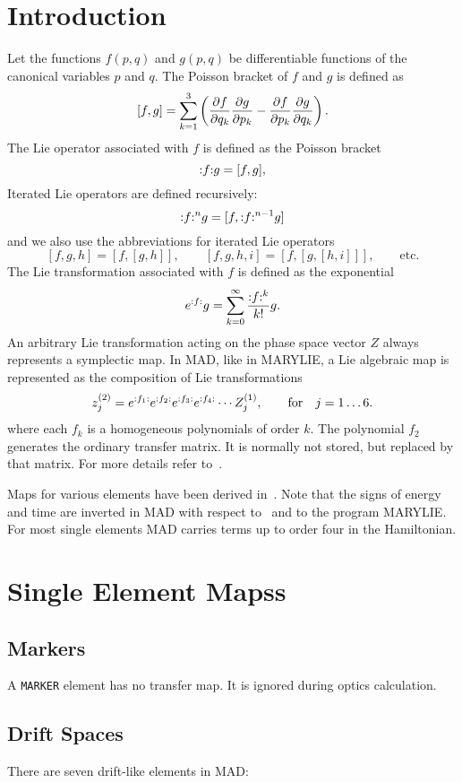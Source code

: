 \section{Introduction}
\label{LieIntro}
Let the functions $f(p,q)$ and $g(p,q)$ be differentiable functions of
the canonical variables $p$ and $q$. The Poisson bracket of $f$ and
$g$ is defined as
\[
[f,g] = \sum_{k=1}^3\left( {\partial f\over\partial q_k}{\partial g\over\partial p_k} - {\partial f\over\partial p_k}{\partial g\over\partial q_k} \right).
\]
The Lie operator associated with $f$ is defined as the Poisson bracket
\[
{:}{f}{:} g = [f,g],
\]
Iterated Lie operators are defined recursively:
\[
{:}{f}{:}^n g = [f,{:}{f}{:}^{n-1}g]
\]
and we also use the abbreviations for iterated Lie operators
\[
[f,g,h] = [f,[g,h]], \qquad
[f,g,h,i] = [f,[g,[h,i]]],\qquad
\mathrm{etc.}
\]
The Lie transformation associated with $f$ is defined as the exponential
\[
e^{{:}{f}{:}} g = \sum_{k=0}^\infty \frac{{:}{f}{:}^k}{k!} g.
\]
An arbitrary Lie transformation acting on the phase space vector $Z$
always represents a symplectic map.
In MAD, like in MARYLIE,
a Lie algebraic map is represented as the composition of Lie
transformations
\[
z^{(2)}_j = e^{{:}{f_1}{:}} e^{{:}{f_2}{:}} e^{{:}{f_3}{:}} e^{{:}{f_4}{:}} \cdots 
  Z^{(1)}_j, \qquad \mathrm{for} \quad j = 1 \ldots 6.
\]
where each $f_k$ is a homogeneous polynomials of order $k$.
The polynomial $f_2$ generates the ordinary transfer matrix.
It is normally not stored, but replaced by that matrix.
For more details refer to~\cite{DOU82,DRA81,HEA86}.

Maps for various elements have been derived in~\cite{DOU82,ISE85}.
Note that the signs of energy and time are inverted in MAD with respect
to~\cite{DOU82} and to the program MARYLIE.
For most single elements MAD carries terms up to order four in the
Hamiltonian.

\section{Single Element Mapss}

\subsection{Markers}
A {\tt MARKER} element has no transfer map.
It is ignored during optics calculation.

\subsection{Drift Spaces}
There are seven drift-like elements in MAD:

